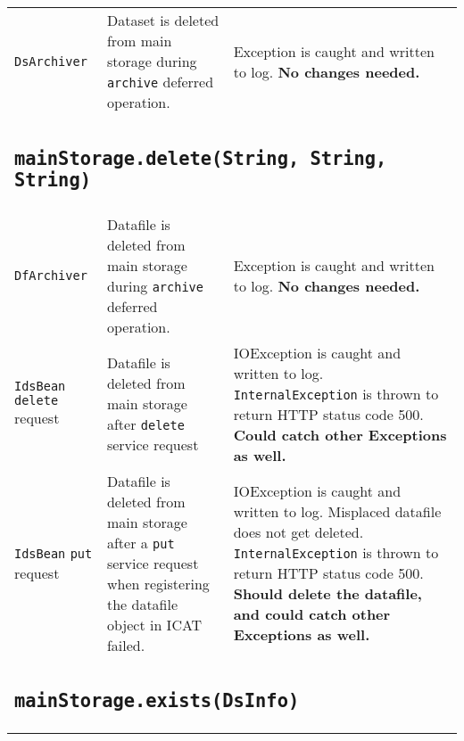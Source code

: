 \documentclass[paper=a4]{scrartcl}
\begin{document}
\begin{longtable}{ p{32mm} | p{48mm} | p{48mm} }
    \raggedright \texttt{DsArchiver} &
    \raggedright Dataset is deleted from main storage during \texttt{archive} deferred operation. &
    \raggedright Exception is caught and written to log. \textbf{No changes needed.}
    \tabularnewline

    \multicolumn{3}{p{\textwidth}}{
      \subsection{\texttt{mainStorage.delete(String, String, String)}}
    } \\

    \raggedright \texttt{DfArchiver} &
    \raggedright Datafile is deleted from main storage during \texttt{archive} deferred operation. &
    \raggedright Exception is caught and written to log. \textbf{No changes needed.}
    \tabularnewline[4mm]
    \raggedright \texttt{IdsBean} \texttt{delete} request &
    \raggedright Datafile is deleted from main storage after \texttt{delete} service request &
    \raggedright IOException is caught and written to log. \texttt{InternalException} is thrown to return HTTP status code 500. \textbf{Could catch other Exceptions as well.}
    \tabularnewline[4mm]
    \raggedright \texttt{IdsBean} \texttt{put} request &
    \raggedright Datafile is deleted from main storage after a \texttt{put} service request when registering the datafile object in ICAT failed. &
    \raggedright IOException is caught and written to log. Misplaced datafile does not get deleted. \texttt{InternalException} is thrown to return HTTP status code 500. \textbf{Should delete the datafile, and could catch other Exceptions as well.}
    \tabularnewline

    \multicolumn{3}{p{\textwidth}}{
      \subsection{\texttt{mainStorage.exists(DsInfo)}}
    } \\


\end{longtable}
\end{document}
